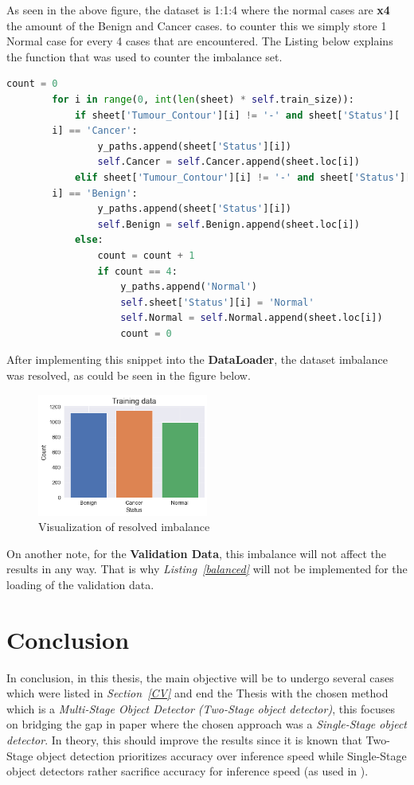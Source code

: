 \documentclass[12pt]{extarticle}
\begin{document}
	As seen in the above figure, the dataset is 1:1:4 where the normal cases are \textbf{x4} the amount of the Benign and Cancer cases.
	to counter this we simply store 1 Normal case for every 4 cases that are encountered. The Listing below explains the function that was used to counter the imbalance set.
	\begin{lstlisting}[language=Python, caption=Python code to resolve the imbalanced data, label=balanced]
		count = 0
		for i in range(0, int(len(sheet) * self.train_size)):
			if sheet['Tumour_Contour'][i] != '-' and sheet['Status'][
		i] == 'Cancer':
				y_paths.append(sheet['Status'][i])
				self.Cancer = self.Cancer.append(sheet.loc[i])
			elif sheet['Tumour_Contour'][i] != '-' and sheet['Status'][
		i] == 'Benign':
				y_paths.append(sheet['Status'][i])
				self.Benign = self.Benign.append(sheet.loc[i])
			else:
				count = count + 1
				if count == 4:
					y_paths.append('Normal')
					self.sheet['Status'][i] = 'Normal'
					self.Normal = self.Normal.append(sheet.loc[i])
					count = 0
	\end{lstlisting}
	After implementing this snippet into the \textbf{DataLoader}, the dataset imbalance was resolved, as could be seen in the figure below.
	\begin{figure}[h]
		\centering
		\includegraphics[width=0.5\textwidth]{pics/Figures/Train_balance.png}
		\caption{\small{Visualization of resolved imbalance}}
		\label{fig:balance}
	\end{figure}
	On another note, for the \textbf{Validation Data}, this imbalance will not affect the results in any way. That is why \emph{Listing~\ref{balanced}} will not be implemented for the loading of the validation data.
	\section{Conclusion}
	In conclusion, in this thesis, the main objective will be to undergo several cases which were listed in \emph{Section~\ref{CV}} and end the Thesis with the chosen method which is a \emph{Multi-Stage Object Detector (Two-Stage object detector)}, this focuses on bridging the gap in paper \cite{one_shot} where the chosen approach was a \emph{Single-Stage object detector}. In theory, this should improve the results since it is known that Two-Stage object detection prioritizes accuracy over inference speed while Single-Stage object detectors rather sacrifice accuracy for inference speed (as used in \cite{one_shot}). 
	\newpage

	
	
	
	
\end{document}
